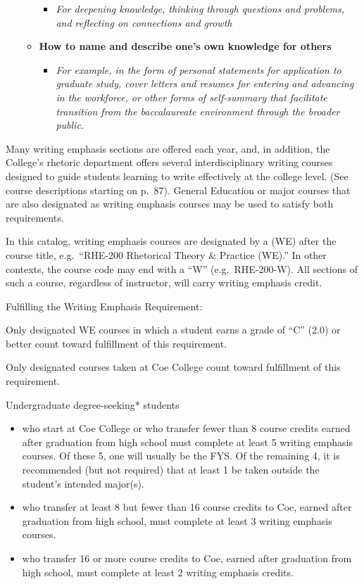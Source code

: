 \documentclass[
  letterpaper,
]{scrbook}
\providecommand{\tightlist}{%
  \setlength{\itemsep}{0pt}\setlength{\parskip}{0pt}}
\begin{document}
\begin{itemize}
\begin{itemize}
    \begin{itemize}
    \tightlist
    \item
      \emph{For deepening knowledge, thinking through questions and
      problems, and reflecting on connections and growth}
    \end{itemize}
  \item
    \textbf{How to name and describe one's own knowledge for others}

    \begin{itemize}
    \tightlist
    \item
      \emph{For example, in the form of personal statements for
      application to graduate study, cover letters and resumes for
      entering and advancing in the workforce, or other forms of
      self-summary that facilitate transition from the baccalaureate
      environment through the broader public.}
    \end{itemize}
  \end{itemize}
\end{itemize}

Many writing emphasis sections are offered each year, and, in addition,
the College's rhetoric department offers several interdisciplinary
writing courses designed to guide students learning to write effectively
at the college level. (See course descriptions starting on p.~87).
General Education or major courses that are also designated as writing
emphasis courses may be used to satisfy both requirements.

In this catalog, writing emphasis courses are designated by a (WE) after
the course title, e.g.~``RHE-200 Rhetorical Theory \& Practice (WE).''
In other contexts, the course code may end with a ``W''
(e.g.~RHE-200-W). All sections of such a course, regardless of
instructor, will carry writing emphasis credit.

Fulfilling the Writing Emphasis Requirement:

Only designated WE courses in which a student earns a grade of ``C''
(2.0) or better count toward fulfillment of this requirement.

Only designated courses taken at Coe College count toward fulfillment of
this requirement.

Undergraduate degree-seeking* students

\begin{itemize}
\item
  who start at Coe College or who transfer fewer than 8 course credits
  earned after graduation from high school must complete at least 5
  writing emphasis courses. Of these 5, one will usually be the FYS. Of
  the remaining 4, it is recommended (but not required) that at least 1
  be taken outside the student's intended major(s).
\item
  who transfer at least 8 but fewer than 16 course credits to Coe,
  earned after graduation from high school, must complete at least 3
  writing emphasis courses.
\item
  who transfer 16 or more course credits to Coe, earned after graduation
  from high school, must complete at least 2 writing emphasis credits.
\end{itemize}
\end{document}
